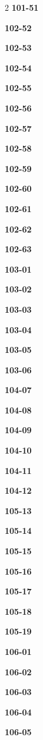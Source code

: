 \documentclass[10pt,a4paper]{article}
\begin{document}
\begin{multicols}{2}
\noindent\textbf{101-51}\ \par
\noindent\textbf{102-52}\ \par
\noindent\textbf{102-53}\ \par
\noindent\textbf{102-54}\ \par
\noindent\textbf{102-55}\ \par
\noindent\textbf{102-56}\ \par
\noindent\textbf{102-57}\ \par
\noindent\textbf{102-58}\ \par
\noindent\textbf{102-59}\ \par
\noindent\textbf{102-60}\ \par
\noindent\textbf{102-61}\ \par
\noindent\textbf{102-62}\ \par
\noindent\textbf{102-63}\ \par
\noindent\textbf{103-01}\ \par
\noindent\textbf{103-02}\ \par
\noindent\textbf{103-03}\ \par
\noindent\textbf{103-04}\ \par
\noindent\textbf{103-05}\ \par
\noindent\textbf{103-06}\ \par
\noindent\textbf{104-07}\ \par
\noindent\textbf{104-08}\ \par
\noindent\textbf{104-09}\ \par
\noindent\textbf{104-10}\ \par
\noindent\textbf{104-11}\ \par
\noindent\textbf{104-12}\ \par
\noindent\textbf{105-13}\ \par
\noindent\textbf{105-14}\ \par
\noindent\textbf{105-15}\ \par
\noindent\textbf{105-16}\ \par
\noindent\textbf{105-17}\ \par
\noindent\textbf{105-18}\ \par
\noindent\textbf{105-19}\ \par
\noindent\textbf{106-01}\ \par
\noindent\textbf{106-02}\ \par
\noindent\textbf{106-03}\ \par
\noindent\textbf{106-04}\ \par
\noindent\textbf{106-05}\ \par

\end{multicols}
\end{document}
